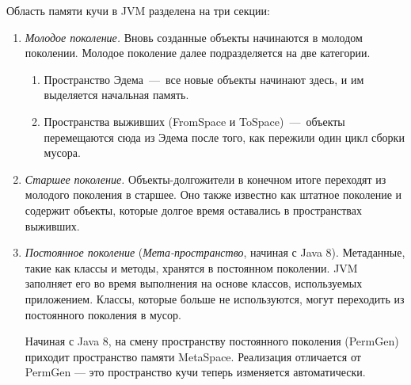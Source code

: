 Область памяти кучи в JVM разделена на три секции:
\begin{enumerate}
	\item \emph{Молодое поколение.} 
	Вновь созданные объекты начинаются в молодом поколении. Молодое поколение далее подразделяется на две категории.
	\begin{enumerate}
		\item Пространство Эдема~---~все новые объекты начинают здесь, и им выделяется начальная память.
		\item Пространства выживших (FromSpace и ToSpace)~---~объекты перемещаются сюда из Эдема после того, как пережили один цикл сборки мусора.
	\end{enumerate}
	
	\item \emph{Старшее поколение.}
	Объекты-долгожители в конечном итоге переходят из молодого поколения в старшее. Оно также известно как штатное поколение и содержит объекты, которые долгое время оставались в пространствах выживших.
	\item \emph{Постоянное поколение} (\emph{Мета-пространство}, начиная с Java 8).
	Метаданные, такие как классы и методы, хранятся в постоянном поколении. JVM заполняет его во время выполнения на основе классов, используемых приложением. Классы, которые больше не используются, могут переходить из постоянного поколения в мусор.
	
	Начиная с Java 8, на смену пространству постоянного поколения (PermGen) приходит пространство памяти MetaSpace. Реализация отличается от PermGen — это пространство кучи теперь изменяется автоматически.
\end{enumerate}